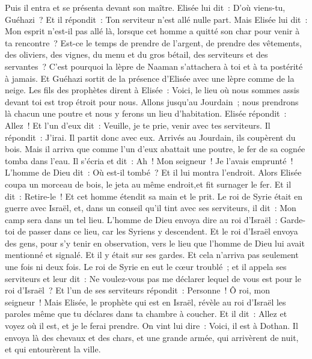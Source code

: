 \begin{multicols}{2}
Puis il entra et se présenta devant son maître. Elisée lui dit~: D'où viens-tu, Guéhazi~? Et il répondit~: Ton serviteur n'est allé nulle part.
Mais Elisée lui dit~: Mon esprit n'est-il pas allé là, lorsque cet homme a quitté son char pour venir à ta rencontre~? Est-ce le temps de prendre de l'argent, de prendre des vêtements, des oliviers, des vignes, du menu et du gros bétail, des serviteurs et des servantes~?
C'est pourquoi la lèpre de Naaman s'attachera à toi et à ta postérité à jamais. Et Guéhazi sortit de la présence d'Elisée avec une lèpre comme de la neige.
\VerseOne{}Les fils des prophètes dirent à Elisée~: Voici, le lieu où nous sommes assis devant toi est trop étroit pour nous.
Allons jusqu'au Jourdain~; nous prendrons là chacun une poutre et nous y ferons un lieu d'habitation. Elisée répondit~: Allez~!
Et l'un d'eux dit~: Veuille, je te prie, venir avec tes serviteurs. Il répondit~: J'irai.
Il partit donc avec eux. Arrivés au Jourdain, ils coupèrent du bois.
Mais il arriva que comme l'un d'eux abattait une poutre, le fer de sa cognée tomba dans l'eau. Il s'écria et dit~: Ah~! Mon seigneur~! Je l'avais emprunté~!
L'homme de Dieu dit~: Où est-il tombé~? Et il lui montra l'endroit. Alors Elisée coupa un morceau de bois, le jeta au même endroit,et fit surnager le fer.
Et il dit~: Retire-le~! Et cet homme étendit sa main et le prit.
Le roi de Syrie était en guerre avec Israël, et, dans un conseil qu'il tint avec ses serviteurs, il dit~: Mon camp sera dans un tel lieu.
L'homme de Dieu envoya dire au roi d'Israël~: Garde-toi de passer dans ce lieu, car les Syriens y descendent.
Et le roi d'Israël envoya des gens, pour s'y tenir en observation, vers le lieu que l'homme de Dieu lui avait mentionné et signalé. Et il y était sur ses gardes. Et cela n'arriva pas seulement une fois ni deux fois.
Le roi de Syrie en eut le cœur troublé~; et il appela ses serviteurs et leur dit~: Ne voulez-vous pas me déclarer lequel de vous est pour le roi d'Israël~?
Et l'un de ses serviteurs répondit~: Personne~! Ô roi, mon seigneur~! Mais Elisée, le prophète qui est en Israël, révèle au roi d'Israël les paroles même que tu déclares dans ta chambre à coucher.
Et il dit~: Allez et voyez où il est, et je le ferai prendre. On vint lui dire~: Voici, il est à Dothan.
Il envoya là des chevaux et des chars, et une grande armée, qui arrivèrent de nuit, et qui entourèrent la ville.

\end{multicols}
